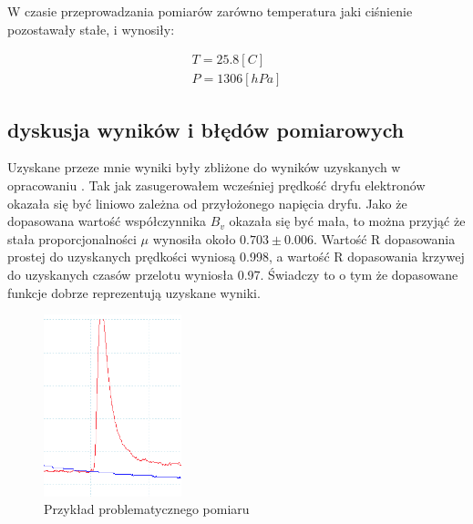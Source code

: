 \documentclass[10pt,a4paper]{article}
\begin{document}
W czasie przeprowadzania pomiarów zarówno temperatura jaki ciśnienie pozostawały stałe, i wynosiły:

\begin{gather*}
    T =  25.8 [C]\\
    P = 1306 [hPa]
\end{gather*}

\newpage

\subsection{dyskusja wyników i błędów pomiarowych}

Uzyskane przeze mnie wyniki były zbliżone do wyników uzyskanych w opracowaniu \cite{opracowanie}. Tak jak zasugerowałem wcześniej prędkość dryfu elektronów okazała się być liniowo zależna od przyłożonego napięcia dryfu. Jako że dopasowana wartość współczynnika $B_v$ okazała się być mała, to można przyjąć że stała proporcjonalności $\mu$ wynosiła około $0.703 \pm 0.006$. Wartość R dopasowania prostej do uzyskanych prędkości wyniosą 0.998, a wartość R dopasowania krzywej do uzyskanych czasów przelotu wyniosła 0.97. Świadczy to o tym że dopasowane funkcje dobrze reprezentują uzyskane wyniki. \begin{figure}
    \centering
    \includegraphics[width=4cm]{diagrams/zjebany.png}
    \caption{Przykład problematycznego pomiaru}
    \label{blad}

\end{figure}
\end{document}
